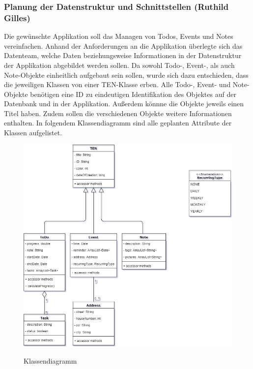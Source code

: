 \newpage
\subsubsection{Planung der Datenstruktur und Schnittstellen (Ruthild Gilles)}

Die gewünschte Applikation soll das Managen von Todos, Events und Notes vereinfachen. Anhand der Anforderungen an die Applikation überlegte sich das Datenteam, welche Daten beziehungsweise Informationen in der Datenstruktur der Applikation abgebildet werden sollen. Da sowohl Todo-, Event-, als auch Note-Objekte einheitlich aufgebaut sein sollen, wurde sich dazu entschieden, dass die jeweiligen Klassen von einer TEN-Klasse erben. Alle Todo-, Event- und Note-Objekte benötigen eine ID zu eindeutigen Identifikation des Objektes auf der Datenbank und in der Applikation. Außerdem könnne die Objekte jeweils einen Titel haben. Zudem sollen die verschiedenen Objekte weitere Informationen enthalten. In folgendem Klassendiagramm sind alle geplanten Attribute der Klassen aufgelistet.

\begin{figure}[H]
\centering
\begin{minipage}[t]{1\textwidth} %
\caption{Klassendiagramm} %
\includegraphics[width=1\textwidth]{img/Klassendiagramm}\\ %
\end{minipage}
\end{figure}

